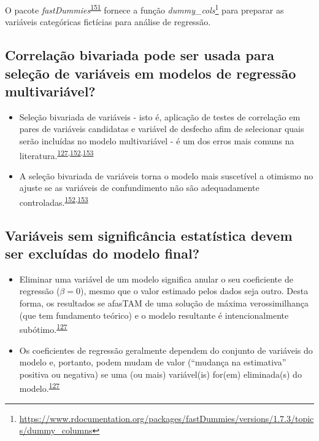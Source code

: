 \documentclass[
  a4paper,
]{book}
\renewcommand{\href}[2]{#2\footnote{\url{#1}}}
\newenvironment{infobox}[1]
  {
  \begin{itemize}
  \renewcommand{\labelitemi}{
    \raisebox{-.7\height}[0pt][0pt]{
      {\setkeys{Gin}{width=3em,keepaspectratio}
        \texttt{[image: \#1]}}
    }
  }
  \setlength{\fboxsep}{1em}
  \begin{blackbox}
  \item
  }
  {
  \end{blackbox}
  \end{itemize}
  }
\begin{document}
\begin{infobox}{images/Rlogo}
O pacote \emph{fastDummies}\textsuperscript{\protect\hyperlink{ref-fastDummies}{151}} fornece a função \href{https://www.rdocumentation.org/packages/fastDummies/versions/1.7.3/topics/dummy_columns}{\emph{dummy\_cols}} para preparar as variáveis categóricas fictícias para análise de regressão.

\end{infobox}

\hypertarget{correlauxe7uxe3o-bivariada-pode-ser-usada-para-seleuxe7uxe3o-de-variuxe1veis-em-modelos-de-regressuxe3o-multivariuxe1vel}{%
\subsection{Correlação bivariada pode ser usada para seleção de variáveis em modelos de regressão multivariável?}\label{correlauxe7uxe3o-bivariada-pode-ser-usada-para-seleuxe7uxe3o-de-variuxe1veis-em-modelos-de-regressuxe3o-multivariuxe1vel}}

\begin{itemize}
\item
  Seleção bivariada de variáveis - isto é, aplicação de testes de correlação em pares de variáveis candidatas e variável de desfecho afim de selecionar quais serão incluídas no modelo multivariável - é um dos erros mais comuns na literatura.\textsuperscript{\protect\hyperlink{ref-heinze2016}{127},\protect\hyperlink{ref-Dales1978}{152},\protect\hyperlink{ref-Sun1996}{153}}
\item
  A seleção bivariada de variáveis torna o modelo mais suscetível a otimismo no ajuste se as variáveis de confundimento não são adequadamente controladas.\textsuperscript{\protect\hyperlink{ref-Dales1978}{152},\protect\hyperlink{ref-Sun1996}{153}}
\end{itemize}

\hypertarget{variuxe1veis-sem-significuxe2ncia-estatuxedstica-devem-ser-excluuxeddas-do-modelo-final}{%
\subsection{Variáveis sem significância estatística devem ser excluídas do modelo final?}\label{variuxe1veis-sem-significuxe2ncia-estatuxedstica-devem-ser-excluuxeddas-do-modelo-final}}

\begin{itemize}
\item
  Eliminar uma variável de um modelo significa anular o seu coeficiente de regressão (\(\beta = 0\)), mesmo que o valor estimado pelos dados seja outro. Desta forma, os resultados se afasTAM de uma solução de máxima verossimilhança (que tem fundamento teórico) e o modelo resultante é intencionalmente subótimo.\textsuperscript{\protect\hyperlink{ref-heinze2016}{127}}
\item
  Os coeficientes de regressão geralmente dependem do conjunto de variáveis do modelo e, portanto, podem mudam de valor (``mudança na estimativa'' positiva ou negativa) se uma (ou mais) variável(is) for(em) eliminada(s) do modelo.\textsuperscript{\protect\hyperlink{ref-heinze2016}{127}}
\end{itemize}
\end{document}
